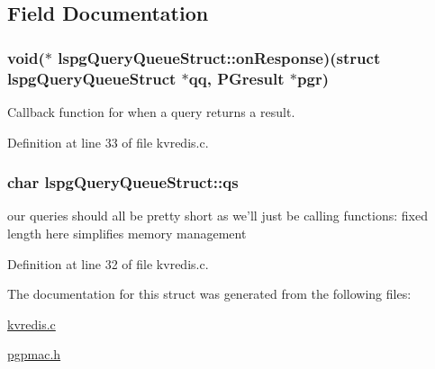 \subsection{Field Documentation}
\hypertarget{structlspgQueryQueueStruct_a53bac5ae4cab775423940bff5092a831}{
\subsubsection[{on\-Response}]{\setlength{\rightskip}{0pt plus 5cm}void($\ast$ lspg\-Query\-Queue\-Struct\-::on\-Response)(struct {\bf lspg\-Query\-Queue\-Struct} $\ast$qq, P\-Gresult $\ast$pgr)}}\label{structlspgQueryQueueStruct_a53bac5ae4cab775423940bff5092a831}


Callback function for when a query returns a result. 



Definition at line 33 of file kvredis.\-c.

\hypertarget{structlspgQueryQueueStruct_a1389b3ec4ddf9ed5cc0344d229a7ff9e}{
\subsubsection[{qs}]{\setlength{\rightskip}{0pt plus 5cm}char lspg\-Query\-Queue\-Struct\-::qs}}\label{structlspgQueryQueueStruct_a1389b3ec4ddf9ed5cc0344d229a7ff9e}


our queries should all be pretty short as we'll just be calling functions\-: fixed length here simplifies memory management 



Definition at line 32 of file kvredis.\-c.



The documentation for this struct was generated from the following files\-:\begin{DoxyCompactItemize}
\item 
\hyperlink{kvredis_8c}{kvredis.\-c}\item 
\hyperlink{pgpmac_8h}{pgpmac.\-h}\end{DoxyCompactItemize}
